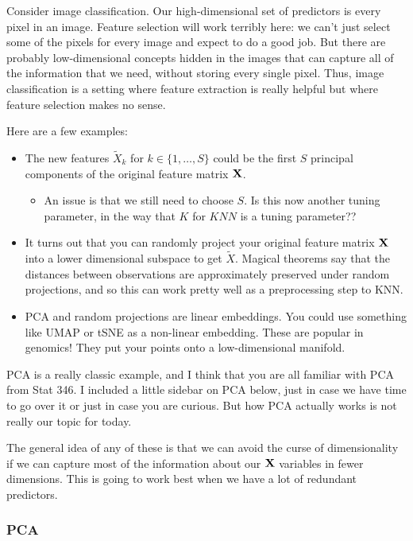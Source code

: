 Consider image classification. Our high-dimensional set of predictors is every pixel in an image. Feature selection will work terribly here: we can't just select some of the pixels for every image and expect to do a good job. But there are probably low-dimensional concepts hidden in the images that can capture all of the information that we need, without storing every single pixel. Thus, image classification is a setting where feature extraction is really helpful but where feature selection makes no sense.

Here are a few examples:

\begin{itemize}
\item The new features $\tilde{X}_k$ for  $k \in \{1,\ldots, S\}$ could be the first $S$ principal components of the original feature matrix $\bold{X}$. \begin{itemize}
\item An issue is that we still need to choose $S$. Is this now another tuning parameter, in the way that $K$ for $KNN$ is a tuning parameter?? 
\end{itemize}
\item It turns out that you can randomly project your original feature matrix $\bold{X}$ into a lower dimensional subspace to get $\tilde{X}$. Magical theorems say that the distances between observations are approximately preserved under random projections, and so this can work pretty well as a preprocessing step to KNN. 
\item PCA and random projections are linear embeddings. You could use something like UMAP or tSNE as a non-linear embedding. These are popular in genomics! They put your points onto a low-dimensional manifold. 
\end{itemize}

PCA is a really classic example, and I think that you are all familiar with PCA from Stat 346. I included a little sidebar on PCA below, just in case we have time to go over it or just in case you are curious. But how PCA actually works is not really our topic for today. 

The general idea of any of these is that we can avoid the curse of dimensionality if we can capture most of the information about our $\bold{X}$ variables in fewer dimensions. This is going to work best when we have a lot of redundant predictors. 

\subsubsection{PCA}

